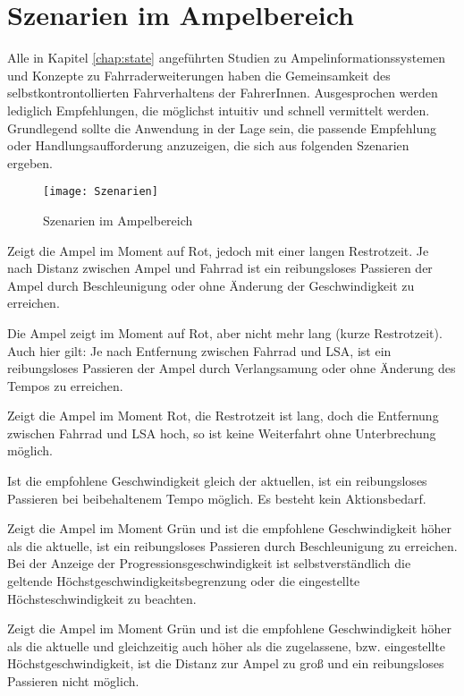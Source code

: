\chapter{\label{chap:szenarien}Szenarien im Ampelbereich}
Alle in Kapitel \ref{chap:state} angeführten Studien zu Ampelinformationssystemen und Konzepte zu Fahrraderweiterungen haben die Gemeinsamkeit des selbstkontrontollierten Fahrverhaltens der FahrerInnen. Ausgesprochen werden lediglich Empfehlungen, die möglichst intuitiv und schnell vermittelt werden. Grundlegend sollte die Anwendung in der Lage sein, die passende Empfehlung oder Handlungsaufforderung anzuzeigen, die sich aus folgenden Szenarien ergeben.
\begin{figure}[H]  
    \centering  
    \texttt{[image: Szenarien]} 
    \caption[Szenarien]{Szenarien im Ampelbereich}
    \label{fig:szenarien}
\end{figure}
\begin{description}[leftmargin=0.7cm,style=nextline]
\item[Szenario R1:] 
Zeigt die Ampel im Moment auf Rot, jedoch mit einer langen Restrotzeit. Je nach Distanz zwischen Ampel und Fahrrad ist ein reibungsloses Passieren der Ampel durch Beschleunigung oder ohne Änderung der Geschwindigkeit zu erreichen.\\
\item[Szenario R2:] 
Die Ampel zeigt im Moment auf Rot, aber nicht mehr lang (kurze Restrotzeit). Auch hier gilt: Je nach Entfernung zwischen Fahrrad und \gls{LSA}, ist ein reibungsloses Passieren der Ampel durch Verlangsamung oder ohne Änderung des Tempos zu erreichen.\\
\item[Szenario R3:] 
Zeigt die Ampel im Moment Rot, die Restrotzeit ist lang, doch die Entfernung zwischen Fahrrad und \gls{LSA} hoch, so ist keine Weiterfahrt ohne Unterbrechung möglich.\\
\item[Szenario G1:] Ist die empfohlene Geschwindigkeit gleich der aktuellen, ist ein reibungsloses Passieren bei beibehaltenem Tempo möglich. Es besteht kein Aktionsbedarf.\\
\item[Szenario G2:] 
Zeigt die Ampel im Moment Grün und ist die empfohlene Geschwindigkeit höher als die aktuelle, ist ein reibungsloses Passieren durch Beschleunigung zu erreichen. Bei der Anzeige der Progressionsgeschwindigkeit ist selbstverständlich die geltende Höchstgeschwindigkeitsbegrenzung oder die eingestellte Höchsteschwindigkeit zu beachten.\\ 
\item[Szenario G3:] 
Zeigt die Ampel im Moment Grün und ist die empfohlene Geschwindigkeit höher als die aktuelle und gleichzeitig auch höher als die zugelassene, bzw. eingestellte Höchstgeschwindigkeit, ist die Distanz zur Ampel zu groß und ein reibungsloses Passieren nicht möglich.
\end{description}
